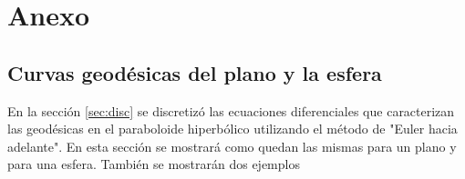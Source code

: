 \documentclass{endm}
\begin{document}




%

\section{Anexo}
\subsection{Curvas geod\'esicas del plano y la esfera}
En la secci\'on \ref{sec:disc} se discretiz\'o las ecuaciones diferenciales que caracterizan las geod\'esicas en el paraboloide hiperb\'olico utilizando el m\'etodo de "Euler hacia adelante". En esta secci\'on se mostrar\'a como quedan las mismas para un plano y para una esfera. Tambi\'en se mostrar\'an dos ejemplos 
\end{document}
